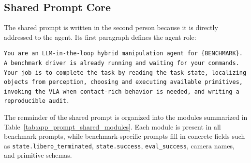 \documentclass{article}
\begin{document}
\subsection{Shared Prompt Core}
\label{app:agent_prompt:shared}

The shared prompt is written in the second person because it is directly addressed to
the agent. Its first paragraph defines the agent role:

\begin{lstlisting}[frame=single,framerule=0.5pt]
You are an LLM-in-the-loop hybrid manipulation agent for {BENCHMARK}.
A benchmark driver is already running and waiting for your commands.
Your job is to complete the task by reading the task state, localizing
objects from perception, choosing and executing available primitives,
invoking the VLA when contact-rich behavior is needed, and writing a
reproducible audit.
\end{lstlisting}

The remainder of the shared prompt is organized into the modules summarized in
Table~\ref{tab:app_prompt_shared_modules}. Each module is present in all benchmark
prompts, while benchmark-specific prompts fill in concrete fields such as
\texttt{state.libero\_terminated}, \texttt{state.success}, \texttt{eval\_success},
camera names, and primitive schemas.
\end{document}
